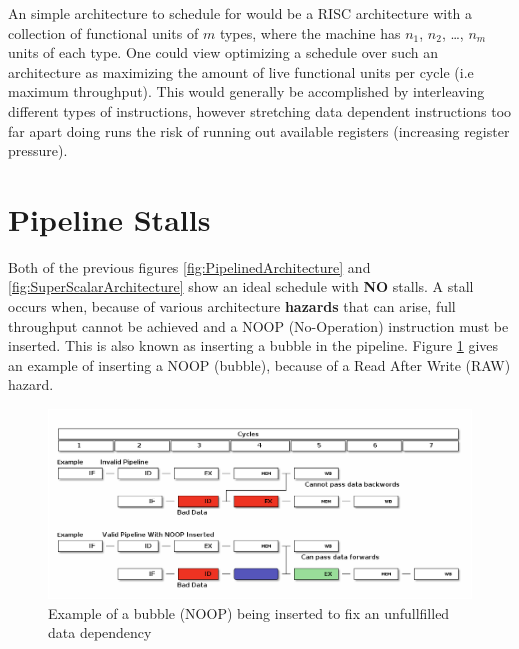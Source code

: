 \documentclass[12pt]{report}
\begin{document}
An simple architecture to schedule for would be a RISC architecture with
a collection of functional units of \(m\) types, where the machine has \(n_1\),
\(n_2\), \ldots{}, \(n_m\) units of each type. One could view optimizing a schedule over such
an architecture as maximizing the amount of live functional units per
cycle (i.e maximum throughput). This would generally be accomplished by
interleaving different types of instructions, however stretching data
dependent instructions too far apart doing runs the risk of running out 
available registers (increasing register pressure). 

\section{Pipeline Stalls}
\label{sec:orga3111e3}
Both of the previous figures \ref{fig:PipelinedArchitecture} and
\ref{fig:SuperScalarArchitecture} show an ideal schedule with \textbf{NO} stalls. A stall
occurs when, because of various architecture \textbf{hazards} that can arise, full throughput
cannot be achieved and a NOOP (No-Operation) instruction must be inserted.
This is also known as inserting a bubble in the pipeline.
Figure \ref{fig:PipelineStall} gives an example of inserting a NOOP (bubble),
because of a Read After Write (RAW) hazard.

\begin{figure}[htbp]
\centering
\includegraphics[width=1.0\textwidth]{figures/PipelineStall.png}
\caption{\label{fig:PipelineStall}
Example of a bubble (NOOP) being inserted to fix an unfullfilled data dependency}
\end{figure}
\end{document}
